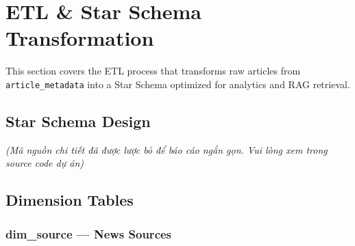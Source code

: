 \hypertarget{etl-star-schema-transformation}{%
\section{ETL \& Star Schema
Transformation}}

This section covers the ETL process that transforms raw articles from
\texttt{article\_metadata} into a Star Schema optimized for analytics
and RAG retrieval.

\hypertarget{star-schema-design}{%
\subsection{Star Schema Design}}

\emph{(Mã nguồn chi tiết đã được lược bỏ để báo cáo ngắn gọn. Vui lòng
xem trong source code dự án)}

\hypertarget{dimension-tables}{%
\subsection{Dimension Tables}}

\hypertarget{dim_source-news-sources}{%
\subsubsection{dim\_source --- News
Sources}}

\begin{Shaded}
\begin{Highlighting}[]
 
 \NormalTok{,}
\NormalTok{(}\NormalTok{) }  \NormalTok{,}
\NormalTok{(}\NormalTok{) }  \NormalTok{,}
\NormalTok{(}\NormalTok{),}
\NormalTok{(}\NormalTok{) } \NormalTok{,}
\NormalTok{(}\NormalTok{) } \NormalTok{,}
  \NormalTok{,}
\NormalTok{);}
\end{Highlighting}
\end{Shaded}


